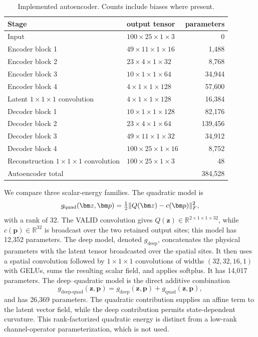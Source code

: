 \documentclass[a4paper,11pt]{article}
\newcommand{\z}{\bm z}
\newcommand{\p}{\bm p}
\DeclarePairedDelimiter{\norm}{\lVert}{\rVert}
\begin{document}
\begin{table}[ht]
\centering\small
\caption{Implemented autoencoder. Counts include biases where present.}
\label{tab:architecture}
\begin{tabular}{llr}\toprule
Stage & output tensor & parameters\\\midrule
Input & $100\times25\times1\times3$ & 0\\
Encoder block 1 & $49\times11\times1\times16$ & 1,488\\
Encoder block 2 & $23\times4\times1\times32$ & 8,768\\
Encoder block 3 & $10\times1\times1\times64$ & 34,944\\
Encoder block 4 & $4\times1\times1\times128$ & 57,600\\
Latent $1\times1\times1$ convolution & $4\times1\times1\times128$ & 16,384\\
Decoder block 1 & $10\times1\times1\times128$ & 82,176\\
Decoder block 2 & $23\times4\times1\times64$ & 139,456\\
Decoder block 3 & $49\times11\times1\times32$ & 34,912\\
Decoder block 4 & $100\times25\times1\times16$ & 8,752\\
Reconstruction $1\times1\times1$ convolution & $100\times25\times1\times3$ & 48\\
\midrule Autoencoder total && 384,528\\\bottomrule
\end{tabular}
\end{table}

We compare three scalar-energy families. The quadratic model is
\begin{equation}
 g_{\mathrm{quad}}(\z,\p)=\tfrac12\norm{Q(\z)-c(\p)}_F^2,
\end{equation}
with a rank of 32. The VALID convolution gives $Q(\z)\in\mathbb R^{2\times1\times1\times32}$, while $c(\p)\in\mathbb R^{32}$ is broadcast over the two retained output sites; this model has 12,352 parameters. The deep model, denoted $g_{\mathrm{deep}}$, concatenates the physical parameters with the latent tensor broadcasted over the spatial sites. It then uses a spatial convolution followed by $1\times1\times1$ convolutions of widths $(32,32,16,1)$ with GELUs, sums the resulting scalar field, and applies softplus. It has 14,017 parameters. The deep--quadratic model is the direct additive combination
\begin{equation}
 g_{\mathrm{deep\text{-}quad}}(\z,\p)=g_{\mathrm{deep}}(\z,\p)+g_{\mathrm{quad}}(\z,\p),
\end{equation}
and has 26,369 parameters. The quadratic contribution supplies an affine term to the latent vector field, while the deep contribution permits state-dependent curvature. This rank-factorized quadratic energy is distinct from a low-rank channel-operator parameterization, which is not used.
\end{document}
